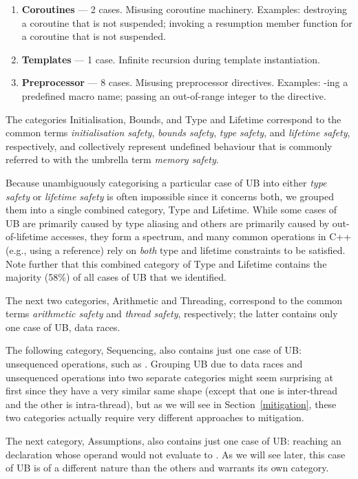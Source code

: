 \begin{enumerate}
\item \textbf{Coroutines} --- 2 cases. Misusing coroutine machinery. Examples: destroying a coroutine that is not suspended; invoking a resumption member function for a coroutine that is not suspended.
\item \textbf{Templates} --- 1 case. Infinite recursion during template instantiation. 
\item \textbf{Preprocessor} --- 8 cases. Misusing preprocessor directives. Examples: -ing a predefined macro name; passing an out-of-range integer to the  directive.
\end{enumerate}

The categories Initialisation, Bounds, and Type and Lifetime correspond to the common terms \emph{initialisation safety}, \emph{bounds safety}, \emph{type safety},  and \emph{lifetime safety}, respectively, and collectively represent undefined behaviour that is commonly referred to with the umbrella term \emph{memory safety}.

Because unambiguously categorising a particular case of UB into either \emph{type safety} or \emph{lifetime safety} is often impossible since it concerns both, we grouped them into a single combined category, Type and Lifetime. While some cases of UB are primarily caused by type aliasing and others are primarily caused by out-of-lifetime accesses, they form a spectrum, and many common operations in C++ (e.g., using a reference) rely on \emph{both} type and lifetime constraints to be satisfied. Note further that this combined category of Type and Lifetime contains the majority (58\%) of all cases of UB that we identified. 

The next two categories, Arithmetic and Threading, correspond to the common terms \emph{arithmetic safety} and \emph{thread safety}, respectively; the latter contains only one case of UB, data races.

The following category, Sequencing, also contains just one case of UB: unsequenced operations, such as \mbox{}. Grouping UB due to data races and unsequenced operations into two separate categories might seem surprising at first since they have a very similar same shape (except that one is inter-thread and the other is intra-thread), but as we will see in Section~\ref{mitigation}, these two categories actually require very different approaches to mitigation.

The next category, Assumptions, also contains just one case of UB: reaching an \tcode{[[assume]]} declaration whose operand would not evaluate to . As we will see later, this case of UB is of a different nature than the others and warrants its own category.

